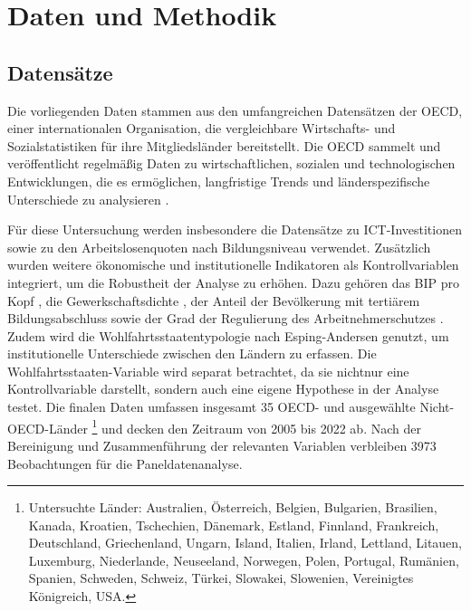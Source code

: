
\section{Daten und Methodik}


\subsection{Datensätze}

Die vorliegenden Daten stammen aus den umfangreichen Datensätzen der \ac{OECD}, einer 
internationalen Organisation, die vergleichbare Wirtschafts- und Sozialstatistiken für ihre 
Mitgliedsländer bereitstellt. Die \ac{OECD} sammelt und veröffentlicht regelmäßig Daten zu 
wirtschaftlichen, sozialen und technologischen Entwicklungen, die es ermöglichen, langfristige 
Trends und länderspezifische Unterschiede zu analysieren \parencite{oecd2022ict}.

Für diese Untersuchung werden insbesondere die Datensätze zu \ac{ICT}-Investitionen 
\parencite{oecd2022ict} sowie zu den Arbeitslosenquoten nach Bildungsniveau 
\parencite{oecd2022unemployment} verwendet. Zusätzlich wurden weitere ökonomische und 
institutionelle Indikatoren als Kontrollvariablen integriert, um die Robustheit der Analyse 
zu erhöhen. Dazu gehören das \ac{BIP} pro Kopf \parencite{oecd2022gdp}, die 
Gewerkschaftsdichte \parencite{oecd2022tud}, der Anteil der Bevölkerung mit tertiärem 
Bildungsabschluss \parencite{oecd2022education} sowie der Grad der Regulierung des 
Arbeitnehmerschutzes \parencite{oecd2022regulation}. Zudem wird die Wohlfahrtsstaatentypologie 
nach Esping-Andersen \parencite{espingandersen1990thethree} genutzt, um institutionelle 
Unterschiede zwischen den Ländern zu erfassen. Die Wohlfahrtsstaaten-Variable wird separat 
betrachtet, da sie nichtnur eine Kontrollvariable darstellt, sondern auch eine eigene 
Hypothese in der Analyse testet. Die finalen Daten umfassen insgesamt 35 OECD- und 
ausgewählte Nicht-OECD-Länder
\footnote{
    Untersuchte Länder: Australien, Österreich, Belgien, Bulgarien, Brasilien, Kanada, 
    Kroatien, Tschechien, Dänemark, Estland, Finnland, Frankreich, Deutschland, Griechenland, 
    Ungarn, Island, Italien, Irland, Lettland, Litauen, Luxemburg, Niederlande, Neuseeland, 
    Norwegen, Polen, Portugal, Rumänien, Spanien, Schweden, Schweiz, Türkei, Slowakei, 
    Slowenien, Vereinigtes Königreich, USA.
} und decken den Zeitraum von 2005 bis 2022 ab. Nach 
der Bereinigung und Zusammenführung der relevanten Variablen verbleiben 3973 Beobachtungen 
für die Paneldatenanalyse.

